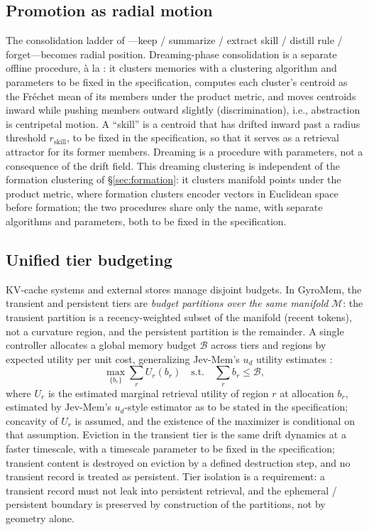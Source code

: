 \documentclass[11pt,a4paper]{article}
\newcommand{\M}{\mathcal{M}}
\begin{document}
\subsection{Promotion as radial motion}

The consolidation ladder of \cite{epistemics}---keep / summarize / extract
skill / distill rule / forget---becomes radial position. Dreaming-phase
consolidation is a separate offline procedure, \`a la \cite{engramrag}: it
clusters memories with a clustering algorithm and parameters to be fixed in the
specification, computes each cluster's centroid as the Fr\'echet mean of
its members under the product metric, and moves centroids inward while
pushing members outward slightly (discrimination), i.e., abstraction is
centripetal motion. A ``skill'' is a centroid that has drifted inward past
a radius threshold $r_{\mathrm{skill}}$, to be fixed in the specification, so
that it serves as a retrieval attractor for its former members. Dreaming
is a procedure with parameters, not a consequence of the drift field.
This dreaming clustering is independent of the formation clustering of
\S\ref{sec:formation}: it clusters manifold points under the product
metric, where formation clusters encoder vectors in Euclidean space
before formation; the two procedures share only the name, with separate
algorithms and parameters, both to be fixed in the specification.

\subsection{Unified tier budgeting}
\label{sec:tiers}

KV-cache systems \cite{actkv,agentkv} and external stores
\cite{jevmem,realm,jam} manage disjoint budgets. In GyroMem, the
transient and persistent tiers are \emph{budget partitions over the same
manifold} $\M$: the transient partition is a recency-weighted subset of
the manifold (recent tokens), not a curvature region, and the persistent
partition is the remainder. A single controller allocates a
global memory budget $\mathcal{B}$ across tiers and regions by expected utility per
unit cost, generalizing Jev-Mem's $u_d$ utility estimates \cite{jevmem}:
\begin{equation}
\max_{\{b_r\}} \sum_r U_r(b_r) \quad \text{s.t.}\quad \sum_r b_r \le \mathcal{B},
\end{equation}
where $U_r$ is the estimated marginal retrieval utility of region $r$ at
allocation $b_r$, estimated by Jev-Mem's $u_d$-style estimator as to be stated in
the specification; concavity of $U_r$ is assumed, and the existence of
the maximizer is conditional on that assumption. Eviction in the transient
tier is the same drift dynamics at a faster timescale, with a timescale
parameter to be fixed in the specification; transient content is destroyed on
eviction by a defined destruction step, and no transient record is
treated as persistent. Tier isolation is a requirement: a transient
record must not leak into persistent retrieval, and the ephemeral /
persistent boundary is preserved by construction of the partitions, not
by geometry alone.
\end{document}
